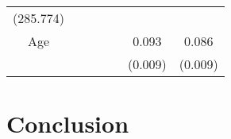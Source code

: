 \documentclass[12pt,twoside]{reedthesis}
\begin{document}
\begin{longtable}[]{@{}ccccccc@{}}
\begin{minipage}[t]{0.12\columnwidth}
  (285.774)\strut
  \end{minipage}\tabularnewline
  \begin{minipage}[t]{0.14\columnwidth}\centering\strut
  Age\strut
  \end{minipage} & \begin{minipage}[t]{0.10\columnwidth}\centering\strut
  \strut
  \end{minipage} & \begin{minipage}[t]{0.11\columnwidth}\centering\strut
  \strut
  \end{minipage} & \begin{minipage}[t]{0.11\columnwidth}\centering\strut
  \strut
  \end{minipage} & \begin{minipage}[t]{0.11\columnwidth}\centering\strut
  \strut
  \end{minipage} & \begin{minipage}[t]{0.11\columnwidth}\centering\strut
  0.093\strut
  \end{minipage} & \begin{minipage}[t]{0.12\columnwidth}\centering\strut
  0.086\strut
  \end{minipage}\tabularnewline
  \begin{minipage}[t]{0.14\columnwidth}\centering\strut
  \strut
  \end{minipage} & \begin{minipage}[t]{0.10\columnwidth}\centering\strut
  \strut
  \end{minipage} & \begin{minipage}[t]{0.11\columnwidth}\centering\strut
  \strut
  \end{minipage} & \begin{minipage}[t]{0.11\columnwidth}\centering\strut
  \strut
  \end{minipage} & \begin{minipage}[t]{0.11\columnwidth}\centering\strut
  \strut
  \end{minipage} & \begin{minipage}[t]{0.11\columnwidth}\centering\strut
  (0.009)\strut
  \end{minipage} & \begin{minipage}[t]{0.12\columnwidth}\centering\strut
  (0.009)\strut
  \end{minipage}\tabularnewline
  \bottomrule
  \end{longtable}
  
  \chapter*{Conclusion}\label{conclusion}
  
\end{document}
